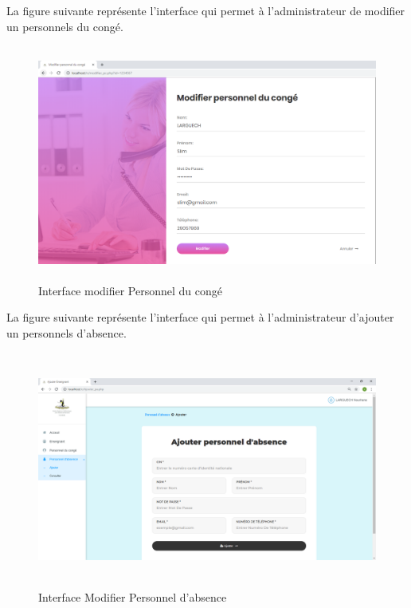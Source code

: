 \documentclass[12 pt]{report}
\begin{document}
La figure suivante représente l'interface qui permet à l'administrateur de modifier un personnels du congé.
\begin{figure}[h]
 \begin{center}
\includegraphics[width= 18 cm ,height=  7.75cm]{modifier_pc.PNG}
\caption{Interface modifier Personnel du congé}

\end{center}
\end{figure}
\newpage
La figure suivante représente l'interface qui permet à l'administrateur d'ajouter un personnels d'absence.
\begin{figure}[h]
 \begin{center}
\includegraphics[width= 18 cm ,height=  7.75cm]{ajouter_pa.PNG}
\caption{Interface Modifier Personnel d'absence}

\end{center}
\end{figure}\\
\end{document}

